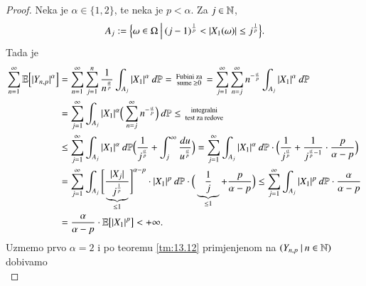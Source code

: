 \begin{proof}
    Neka je $\alpha \in \{1, 2\}$, te neka je $p < \alpha$.
    Za $j \in \mathbb{N}$,
    \begin{equation*}
        A_j := \Big\{ {\omega \in \Omega} \: \Big| \: {(j - 1)^\frac{1}{p} < |X_1 (\omega)| \leq j^\frac{1}{p}} \Big\}.
    \end{equation*}
    Tada je
    \begin{equation*}
        \begin{aligned}
            \sum\limits_{n = 1}^{\infty} \mathbb{E} \Big[ |Y_{n, p}|^\alpha \Big] &= \sum\limits_{n = 1}^{\infty} \sum\limits_{j = 1}^{n} \frac{1}{n^\frac{\alpha}{p}} \int_{A_j} |X_1|^\alpha \: d \mathbb{P} =
            \begin{smallmatrix}
                \textnormal{Fubini za}\\
                \textnormal{sume } \geq 0
            \end{smallmatrix}
            = \sum\limits_{j = 1}^{\infty} \sum\limits_{n = j}^{\infty} n^{- \frac{\alpha}{p}} \int_{A_j} |X_1|^\alpha \: d \mathbb{P}\\
            &= \sum\limits_{j = 1}^{\infty} \int_{A_j} |X_1|^\alpha \Big( \sum\limits_{n = j}^{\infty} n^{-\frac{\alpha}{p}} \Big) \: d \mathbb{P} \leq
            \begin{smallmatrix}
                \textnormal{integralni}\\
                \textnormal{test za redove}
            \end{smallmatrix}\\
            &\leq \sum\limits_{j = 1}^{\infty} \int_{A_j} |X_1|^\alpha \: d \mathbb{P} \Big( \frac{1}{j^\frac{\alpha}{p}} + \int_j^\infty \frac{du}{u^\frac{\alpha}{p}}\Big) = \sum\limits_{j = 1}^{\infty} \int_{A_j} |X_1|^\alpha \: d \mathbb{P} \cdot \Big( \frac{1}{j^\frac{\alpha}{p}} + \frac{1}{j^{\frac{\alpha}{p} - 1}} \cdot \frac{p}{\alpha - p} \Big)\\
            &= \sum\limits_{j = 1}^{\infty} \int_{A_j} \Bigg[ \frac{|X_j|}{ \underbrace{j^\frac{1}{p}}_{\leq 1}} \Bigg]^{\alpha - p} \cdot |X_1|^p \: d \mathbb{P} \cdot \Big( \underbrace{\frac{1}{j}}_{\leq 1} + \frac{p}{\alpha - p} \Big) \leq \sum\limits_{j = 1}^{\infty} \int_{A_j} |X_1|^p \: d \mathbb{P} \cdot \frac{\alpha}{\alpha - p}\\
            &= \frac{\alpha}{\alpha - p} \cdot \mathbb{E} \big[ |X_1|^p \big] < +\infty.
        \end{aligned}
    \end{equation*}
    Uzmemo prvo $\alpha = 2$ i po teoremu \ref{tm:13.12} primjenjenom na $({Y_{n, p}} \: | \: {n \in \mathbb{N}})$ dobivamo
    \begin{equation*}

\end{equation*}
\end{proof}
